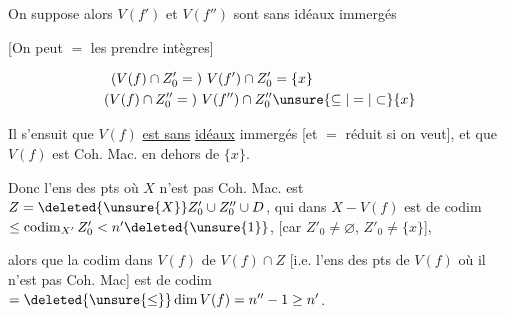 On suppose alors $V(f')$ et $V(f'')$ sont sans idéaux immergés


[On peut $=$ les prendre intègres]

\[
\begin{aligned}
(V(f)\cap Z'_0={})\ V(f')\cap Z'_0&=\{x\}\\
(V(f)\cap Z''_0={})\ V(f'')\cap Z''_0&\unsure{\subseteq|=|\subset}\{x\}
\end{aligned}
\]

Il s'ensuit que $V(f)$ \uline{est sans} \uline{idéaux} immergés [et $=$ réduit si on veut], et que $V(f)$ est Coh. Mac. en dehors de $\{x\}$.


 Donc l'ens des pts où $X$ n'est pas Coh. Mac. est $Z=\deleted{\unsure{X}}Z'_0\cup Z''_0\cup D$, qui dans $X-V(f)$ est de codim $\leq\operatorname{codim}_{X'}Z'_0<n'\deleted{\unsure{1}}$, [car $Z'_0\ne\varnothing$, $Z'_0\ne\{x\}$], 

alors que la codim dans $V(f)$ de $V(f)\cap Z$ [i.e. l'ens des pts de $V(f)$ où  il n'est pas Coh. Mac] est de codim $=\deleted{\unsure{\leq}}\dim V(f)=n''-1\geq n'$.

